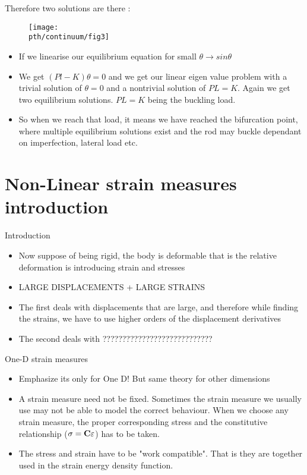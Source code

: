 	\begin{frame}
		Therefore two solutions  are there :
		\begin{figure}
			\centering
			\texttt{[image: \\pth/continuum/fig3]}
			\label{fig:fig3}
		\end{figure}
		\begin{itemize}
			\item If we linearise our equilibrium equation for small $\theta \rightarrow sin \theta$
			\item We get $(Pl - K)\theta = 0$ and we get our linear eigen value problem with a trivial solution of $\theta = 0$ and a nontrivial solution of $PL = K$. Again we get two equilibrium solutions. $PL = K$ being the buckling load. 
			\item So when we reach that load, it means we have reached the bifurcation point, where multiple equilibrium solutions exist and the rod may buckle dependant on imperfection, lateral load etc. 			
		\end{itemize}
	\end{frame}


\section{Non-Linear strain measures introduction}
	\begin{frame}{Introduction}
		\begin{itemize}
			\item Now suppose of being rigid, the body is deformable that is the relative deformation is introducing strain and stresses
			\item LARGE DISPLACEMENTS + LARGE STRAINS
			\item The first deals with displacements that are large, and therefore while finding the strains, we have to use higher orders of the displacement derivatives
			\item The second deals with ????????????????????????????		
		\end{itemize}
	\end{frame}

	\begin{frame}{One-D strain measures}
		\begin{itemize}
			\item Emphasize its only for One D! But same theory for other dimensions
			\item A strain measure need not be fixed. Sometimes the strain measure we usually use may not be able to model the correct behaviour. When we choose any strain measure, the proper corresponding stress and the  constitutive relationship ($\mathbf{\sigma = C \varepsilon}$) has to be taken. 
			\item The stress and strain have to be "work compatible". That is they are together used in the strain energy density function. 			
		\end{itemize}
	\end{frame}


